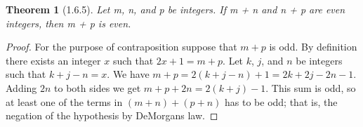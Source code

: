 \documentclass[a4paper, 12pt]{article}
\theoremstyle{plain}
\newtheorem*{theorem*}{Theorem}
\begin{document}
	
	\begin{theorem*}[1.6.5]
		Let m, n, and p be integers. If m + n and n + p are even integers, then m + p is even.
	\end{theorem*}
	
	\begin{proof}
		For the purpose of contraposition suppose that $m + p$ is odd. By definition there exists 
		an integer $x$ such that $2x + 1 = m + p$. Let $k$, $j$, and $n$ be integers such that 
		$k + j - n = x$. We have $m + p = 2(k + j - n) + 1 = 2k + 2j - 2n - 1$. Adding $2n$ to both 
		sides we get $m + p + 2n = 2(k + j) - 1$. This sum is odd, so at least one of the terms in 
		$(m + n) + (p + n)$ has to be odd; that is, the negation of the hypothesis by DeMorgans law.
	\end{proof}
\end{document}
